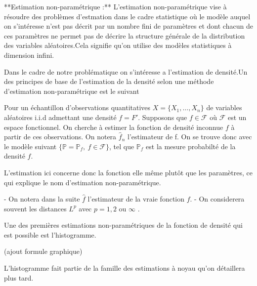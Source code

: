 \documentclass[
]{article}
\begin{document}
\begin{definition}
    **Estimation non-paramétrique :**\newline
 L'estimation non-paramétrique vise à résoudre des problèmes d'estmation dans le cadre statistique où le modèle auquel on s'intéresse n'est pas décrit par un nombre fini de paramètres et dont chacun de ces paramètres ne permet pas de décrire la structure générale de la distribution des variables aléatoires.\newline Cela signifie qu'on utilise des modèles statistiques à dimension infini.
\end{definition}

Dans le cadre de notre problématique on s'intéresse a l'estimation de
densité.\newline Un des principes de base de l'estimation de la densité
selon une méthode d'estimation non-paramétrique est le suivant \newline

\begin{definition}
Pour un échantillon d'observations quantitatives $X=\{X_1, \dots,X_n\}$ de variables aléatoires i.i.d admettant une densité $f= F'$. Supposons que $f \in \mathcal F$ où $\mathcal{F}$ est un espace fonctionnel. On cherche à estimer la fonction de densité inconnue $f$ à partir de ces observations.\newline
On notera $\hat f_n$ l'estimateur de f.\newline
On se trouve donc avec le modèle suivant $\{\mathbb P=\mathbb P_f,~f \in \mathcal F\}$, 
tel que $\mathbb P_f$ est la mesure probabilté de la densité $f$.
\end{definition}

L'estimation ici concerne donc la fonction elle même plutôt que les
paramètres, ce qui explique le nom d'estimation
non-paramétrique.\newline

\begin{remark}  
- On notera dans la suite $\hat f$ l'estimateur de la vraie fonction $f$.  
- On considerera souvent les distances $L^p$ avec $p = 1,2$ ou $\infty$ .
\end{remark}

Une des premières estimations non-paramétriques de la fonction de
densité qui est possible est l'histogramme.

(ajout formule graphique)

L'histogramme fait partie de la famille des estimations à noyau qu'on
détaillera plus tard.
\end{document}
